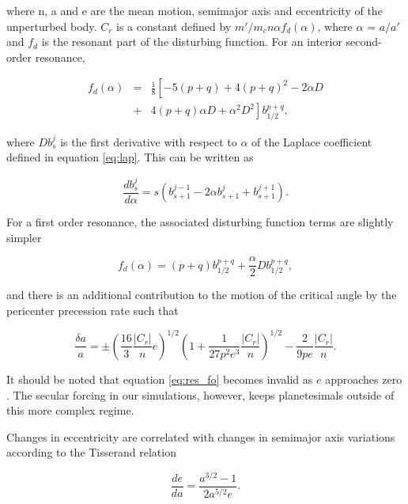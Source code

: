 \documentclass[twocolumn]{aastex63}
\begin{document}
\noindent where n, a and e are the mean motion, semimajor axis and eccentricity of the unperturbed body. $C_{r}$ is a constant defined by 
$m'/m_{c} n \alpha f_{d}(\alpha)$, where $\alpha$ = $a/a'$ and $f_{d}$ is the resonant part of the disturbing function. For an interior second-order 
resonance,

\begin{eqnarray}\label{eq:fd_so}
	f_{d} (\alpha) &=& \frac{1}{8} \left[ -5(p+q) + 4(p+q)^{2} - 2 \alpha D \right. \\ \nonumber
	                      & + & \left. 4(p+q) \alpha D + \alpha^{2} D^{2} \right] b^{p+q}_{1/2},
\end{eqnarray}

\noindent where $D b^{j}_{s}$ is the first derivative with respect to $\alpha$ of the Laplace coefficient defined in equation \ref{eq:lap}. This can 
be written as

\begin{equation}\label{eq:lap_d}
	\frac{d b_{s}^{j}}{d \alpha} = s \left( b_{s+1}^{j-1} - 2 \alpha b_{s+1}^{j} + b_{s+1}^{j+1} \right).
\end{equation}

For a first order resonance, the associated disturbing function terms are slightly simpler

\begin{equation}\label{eq:fd_fo}
	f_{d}(\alpha) = (p+q) b_{1/2}^{p+q} + \frac{\alpha}{2} D b_{1/2}^{p+q},
\end{equation}

\noindent and there is an additional contribution to the motion of the critical angle by the pericenter precession rate such that

\begin{equation}\label{eq:res_fo}
	\frac{\delta a}{a} = \pm \left(\frac{16}{3} \frac{\left| C_{r} \right|}{n} e \right)^{1/2} \left(  1 + \frac{1}{27 p^2 e^3} \frac{\left| C_{r} \right|}{n} 
	\right)^{1/2} - \frac{2}{9 p e}  \frac{\left| C_{r} \right|}{n}.
\end{equation}

\noindent It should be noted that equation \ref{eq:res_fo} becomes invalid as $e$ approaches zero \citep{2020arXiv200609452M}. The secular forcing 
in our simulations, however, keeps planetesimals outside of this more complex regime.

Changes in eccentricity are correlated with changes in semimajor axis variations according to the Tisserand relation

\begin{equation}\label{eq:tiss}
	\frac{de}{da} = \frac{a^{3/2} - 1}{2 a^{5/2} e}.
\end{equation}
\end{document}
